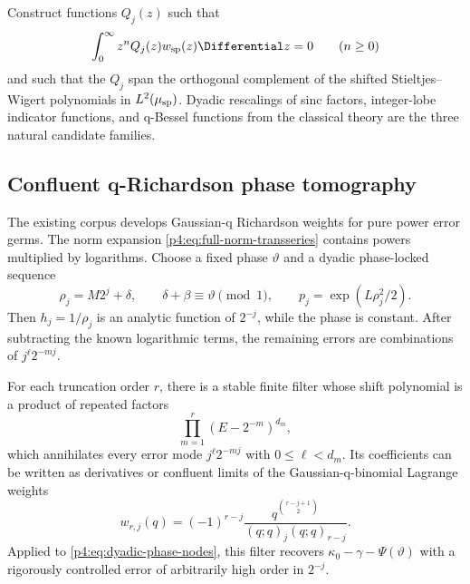 \documentclass[11pt,oneside]{article}
\theoremstyle{definition}
\theoremstyle{remark}
\begin{document}
\begin{problem}
Construct functions $Q_j(z)$ such that
\[
 \int_0^\infty z^nQ_j(z)w_{\rm sp}(z)\Differential z=0
 \qquad(n\geq0)
\]
and such that the $Q_j$ span the orthogonal complement of the shifted
Stieltjes--Wigert polynomials in $L^2(\mu_{\rm sp})$.  Dyadic rescalings of sinc factors,
integer-lobe indicator functions, and q-Bessel functions from the classical theory are the
three natural candidate families.
\end{problem}

\subsection{Confluent q-Richardson phase tomography}

The existing corpus develops Gaussian-q Richardson weights for pure power error germs.
The norm expansion \eqref{p4:eq:full-norm-transseries} contains powers multiplied by logarithms.
Choose a fixed phase $\vartheta$ and a dyadic phase-locked sequence
\begin{equation}
 \rho_j=M2^j+\delta,
 \qquad
 \delta+\beta\equiv\vartheta\pmod1,
 \qquad
 p_j=\exp(L\rho_j^2/2).
 \label{p4:eq:dyadic-phase-nodes}
\end{equation}
Then $h_j=1/\rho_j$ is an analytic function of $2^{-j}$, while the phase is constant.
After subtracting the known logarithmic terms, the remaining errors are combinations of
$j^\ell2^{-mj}$.

\begin{conjecture}
\label{p4:conj:confluent-q-filter}
For each truncation order $r$, there is a stable finite filter whose shift polynomial is a
product of repeated factors
\begin{equation}
 \prod_{m=1}^{r}(E-2^{-m})^{d_m},
 \label{p4:eq:confluent-shift-polynomial}
\end{equation}
which annihilates every error mode $j^\ell2^{-mj}$ with
$0\leq\ell<d_m$.  Its coefficients can be written as derivatives or confluent limits of the
Gaussian-q-binomial Lagrange weights
\begin{equation}
 w_{r,j}(q)=(-1)^{r-j}
 \frac{q^{\binom{r-j+1}{2}}}{(q;q)_j(q;q)_{r-j}}.
 \label{p4:eq:q-Richardson-weights}
\end{equation}
Applied to \eqref{p4:eq:dyadic-phase-nodes}, this filter recovers
$\kappa_0-\gamma-\Psi(\vartheta)$ with a rigorously controlled error of arbitrarily high
order in $2^{-j}$.
\end{conjecture}
\end{document}
